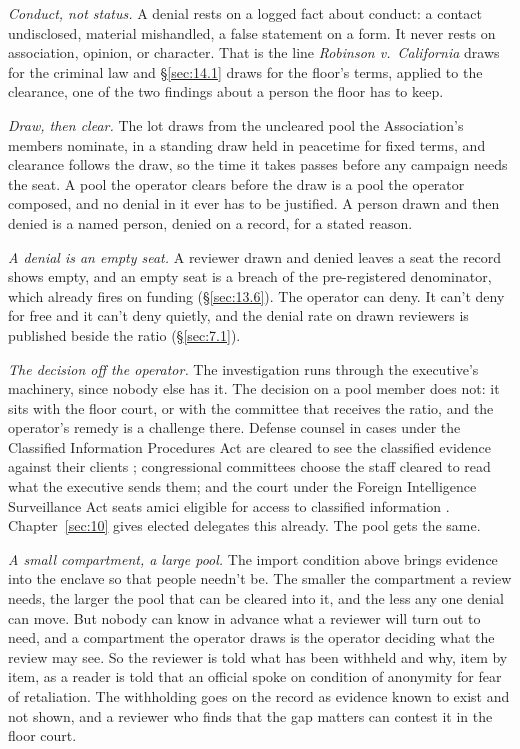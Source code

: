\emph{Conduct, not status.} A denial rests on a logged fact about conduct: a contact undisclosed, material mishandled, a false statement on a form. It never rests on association, opinion, or character. That is the line \emph{Robinson v.\ California} draws for the criminal law \autocite{robinson1962} and \S\ref{sec:14.1} draws for the floor's terms, applied to the clearance, one of the two findings about a person the floor has to keep.

\emph{Draw, then clear.} The lot draws from the uncleared pool the Association's members nominate, in a standing draw held in peacetime for fixed terms, and clearance follows the draw, so the time it takes passes before any campaign needs the seat. A pool the operator clears before the draw is a pool the operator composed, and no denial in it ever has to be justified. A person drawn and then denied is a named person, denied on a record, for a stated reason.

\emph{A denial is an empty seat.} A reviewer drawn and denied leaves a seat the record shows empty, and an empty seat is a breach of the pre-registered denominator, which already fires on funding (\S\ref{sec:13.6}). The operator can deny. It can't deny for free and it can't deny quietly, and the denial rate on drawn reviewers is published beside the ratio (\S\ref{sec:7.1}).

\emph{The decision off the operator.} The investigation runs through the executive's machinery, since nobody else has it. The decision on a pool member does not: it sits with the floor court, or with the committee that receives the ratio, and the operator's remedy is a challenge there. Defense counsel in cases under the Classified Information Procedures Act are cleared to see the classified evidence against their clients \autocite[\S\S\,3–4]{cipa1980}; congressional committees choose the staff cleared to read what the executive sends them; and the court under the Foreign Intelligence Surveillance Act seats amici eligible for access to classified information \autocite{usafreedom2015}. Chapter~\ref{sec:10} gives elected delegates this already. The pool gets the same.

\emph{A small compartment, a large pool.} The import condition above brings evidence into the enclave so that people needn't be. The smaller the compartment a review needs, the larger the pool that can be cleared into it, and the less any one denial can move. But nobody can know in advance what a reviewer will turn out to need, and a compartment the operator draws is the operator deciding what the review may see. So the reviewer is told what has been withheld and why, item by item, as a reader is told that an official spoke on condition of anonymity for fear of retaliation. The withholding goes on the record as evidence known to exist and not shown, and a reviewer who finds that the gap matters can contest it in the floor court.
